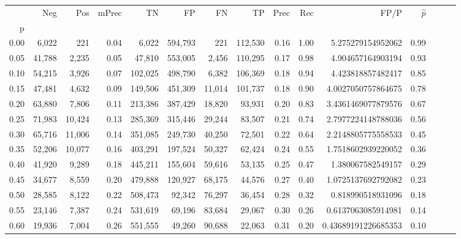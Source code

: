 \begin{tabular}{rrrrrrrrrrrrrrr}
\toprule
{} &     Neg &     Pos & mPrec &       TN &       FP &       FN &       TP &  Prec &   Rec &                  FP/P & $\hat{p}$ \\
p    &         &         &       &          &          &          &          &       &       &                       &           \\
\midrule
0.00 &   6,022 &     221 &  0.04 &    6,022 &  594,793 &      221 &  112,530 &  0.16 &  1.00 &     5.275279154952062 &      0.99 \\
0.05 &  41,788 &   2,235 &  0.05 &   47,810 &  553,005 &    2,456 &  110,295 &  0.17 &  0.98 &     4.904657164903194 &      0.93 \\
0.10 &  54,215 &   3,926 &  0.07 &  102,025 &  498,790 &    6,382 &  106,369 &  0.18 &  0.94 &     4.423818857482417 &      0.85 \\
0.15 &  47,481 &   4,632 &  0.09 &  149,506 &  451,309 &   11,014 &  101,737 &  0.18 &  0.90 &    4.0027050757864675 &      0.78 \\
0.20 &  63,880 &   7,806 &  0.11 &  213,386 &  387,429 &   18,820 &   93,931 &  0.20 &  0.83 &    3.4361469077879576 &      0.67 \\
0.25 &  71,983 &  10,424 &  0.13 &  285,369 &  315,446 &   29,244 &   83,507 &  0.21 &  0.74 &    2.7977224148788036 &      0.56 \\
0.30 &  65,716 &  11,006 &  0.14 &  351,085 &  249,730 &   40,250 &   72,501 &  0.22 &  0.64 &    2.2148805775558533 &      0.45 \\
0.35 &  52,206 &  10,077 &  0.16 &  403,291 &  197,524 &   50,327 &   62,424 &  0.24 &  0.55 &    1.7518602939220052 &      0.36 \\
0.40 &  41,920 &   9,289 &  0.18 &  445,211 &  155,604 &   59,616 &   53,135 &  0.25 &  0.47 &     1.380067582549157 &      0.29 \\
0.45 &  34,677 &   8,559 &  0.20 &  479,888 &  120,927 &   68,175 &   44,576 &  0.27 &  0.40 &    1.0725137692792082 &      0.23 \\
0.50 &  28,585 &   8,122 &  0.22 &  508,473 &   92,342 &   76,297 &   36,454 &  0.28 &  0.32 &     0.818990518931096 &      0.18 \\
0.55 &  23,146 &   7,387 &  0.24 &  531,619 &   69,196 &   83,684 &   29,067 &  0.30 &  0.26 &    0.6137063085914981 &      0.14 \\
0.60 &  19,936 &   7,004 &  0.26 &  551,555 &   49,260 &   90,688 &   22,063 &  0.31 &  0.20 &   0.43689191226685353 &      0.10 \\

\end{tabular}
